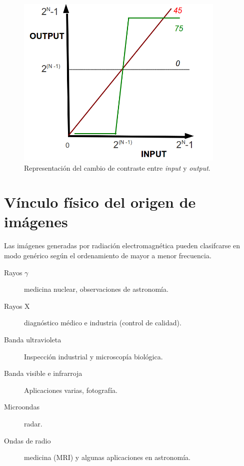 %

\begin{center}
\begin{figure} [!h]

\centering
\includegraphics[width=10cm]{figures/Fig2_2.png}

\caption{Representaci\'on del cambio de contraste entre \textit{input} y \textit{output}.}
\label{Fig2_2}
\end{figure}
\end{center}

%
\section{V\'inculo f\'isico del origen de im\'agenes}

Las im\'agenes generadas por radiaci\'on electromagn\'etica pueden clasifcarse en modo gen\'erico seg\'un el ordenamiento de mayor a menor frecuencia.

\begin{description}
 \item[Rayos $\gamma$] medicina nuclear, observaciones de astronom\'ia.
 \item [Rayos X] diagn\'ostico m\'edico e industria (control de calidad).
 \item[Banda ultravioleta] Inspecci\'on industrial y microscop\'ia biol\'ogica.
 \item[Banda visible e infrarroja] Aplicaciones varias, fotograf\'ia.
 \item[Microondas] radar.
 \item[Ondas de radio] medicina (MRI) y algunas aplicaciones en astronom\'ia.
\end{description}



